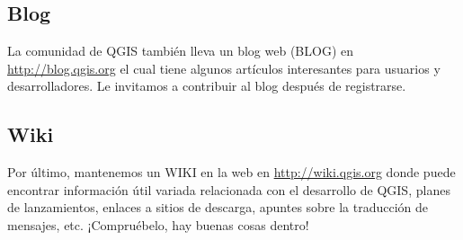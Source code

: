 
\subsection{Blog}
La comunidad de QGIS también lleva un blog web (BLOG) en \url{http://blog.qgis.org} el cual tiene algunos artículos interesantes para usuarios y desarrolladores. Le invitamos a contribuir al blog después de registrarse.

\subsection{Wiki}
Por último, mantenemos un WIKI en la web en \url{http://wiki.qgis.org} donde puede encontrar información útil variada relacionada con el desarrollo de QGIS, planes de lanzamientos, enlaces a sitios de descarga, apuntes sobre la traducción de mensajes, etc. ¡Compruébelo, hay buenas cosas dentro!

